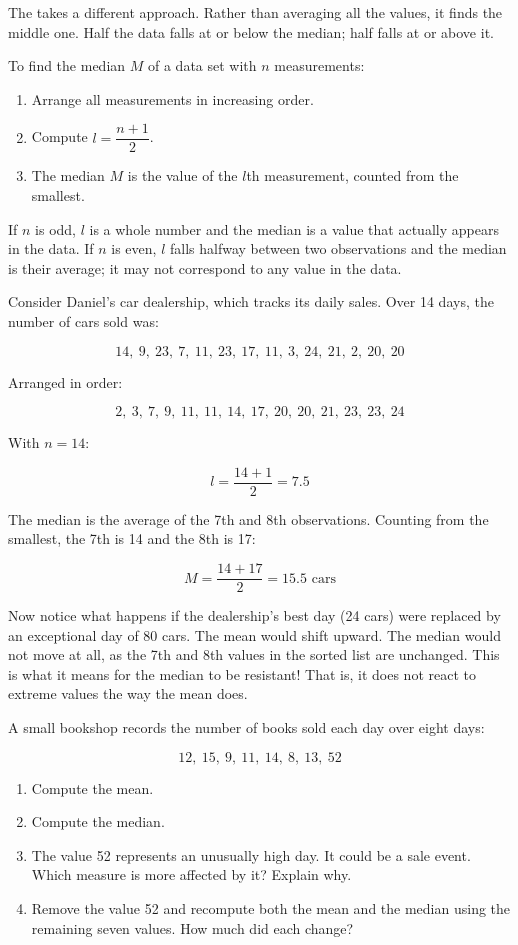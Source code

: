 The  takes a different approach. Rather
than averaging all the values, it finds the middle one. Half the data
falls at or below the median; half falls at or above it.

To find the median $M$ of a data set with $n$ measurements:

\begin{enumerate}
    \item Arrange all measurements in increasing order.
    \item Compute $l = \dfrac{n+1}{2}$.
    \item The median $M$ is the value of the $l$th measurement,
    counted from the smallest.
\end{enumerate}

If $n$ is odd, $l$ is a whole number and the median is a value that
actually appears in the data. If $n$ is even, $l$ falls halfway
between two observations and the median is their average; it may not
correspond to any value in the data.

Consider Daniel's car dealership, which tracks its daily sales. Over
14 days, the number of cars sold was:

\[ 14,\ 9,\ 23,\ 7,\ 11,\ 23,\ 17,\ 11,\ 3,\ 24,\ 21,\ 2,\ 20,\ 20 \]

Arranged in order:

\[ 2,\ 3,\ 7,\ 9,\ 11,\ 11,\ 14,\ 17,\ 20,\ 20,\ 21,\ 23,\ 23,\ 24 \]

With $n = 14$:

\[
l = \frac{14 + 1}{2} = 7.5
\]

The median is the average of the 7th and 8th observations. Counting
from the smallest, the 7th is 14 and the 8th is 17:

\[
M = \frac{14 + 17}{2} = 15.5 \text{ cars}
\]

Now notice what happens if the dealership's best day (24 cars) were
replaced by an exceptional day of 80 cars. The mean would shift upward. The median would not move at all, as the 7th and 8th values in the sorted list are unchanged. This is what it means for the median to be resistant! That is, it does not react to extreme values
the way the mean does.

\begin{Exercise}[title={Computing Mean and Median}, label={ex:mean_median}]
A small bookshop records the number of books sold each day over
eight days:

\[ 12,\ 15,\ 9,\ 11,\ 14,\ 8,\ 13,\ 52 \]

\begin{enumerate}
    \item Compute the mean.
    \item Compute the median.
    \item The value 52 represents an unusually high day. It could be a sale
    event. Which measure is more affected by it? Explain why.
    \item Remove the value 52 and recompute both the mean and the
    median using the remaining seven values. How much did each change?
\end{enumerate}
\end{Exercise}

